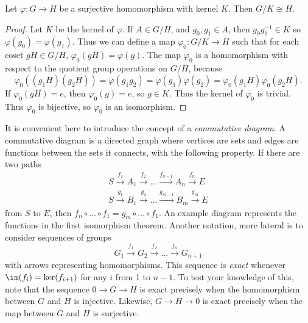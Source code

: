 \begin{theorem} 
Let $\varphi: G \to H$ be a surjective homomorphism with kernel $K$. Then $G/K \cong H$.
\end{theorem}
\begin{proof}
    Let $K$ be the kernel of $\varphi$. If $A \in G/H$, and $g_0,g_1 \in A$, then $g_0 g_1^{-1} \in K$ so $\varphi(g_0) = \varphi(g_1)$. Thus we can define a map $\varphi_0: G/K \to H$ such that for each coset $gH \in G/H$, $\varphi_0(gH) = \varphi(g)$. The map $\varphi_0$ is a homomorphism with respect to the quotient group operations on $G/H$, because
    \[ \varphi_0((g_1H)(g_2H)) = \varphi(g_1g_2) = \varphi(g_1) \varphi(g_2) = \varphi_0(g_1H) \varphi_0(g_2H). \]
    If $\varphi_0(gH) = e$, then $\varphi_0(g) = e$, so $g \in K$. Thus the kernel of $\varphi_0$ is trivial. Thus $\varphi_0$ is bijective, so $\varphi_0$ is an isomorphism.
\end{proof}

\begin{wrapfigure}{1}{3.5cm}
\end{wrapfigure}

It is convenient here to introduce the concept of a \emph{commutative diagram}. A commutative diagram is a directed graph where vertices are sets and edges are functions between the sets it connects, with the following property. If there are two paths
%
\begin{align*}
    S \xrightarrow{f_1} A_1 \xrightarrow{f_2} \dots \xrightarrow{f_{n-1}} A_n \xrightarrow{f_n} E\\
    S \xrightarrow{g_1} B_1 \xrightarrow{g_2} \dots \xrightarrow{g_{m-1}} B_m \xrightarrow{g_m} E
\end{align*}
%
from $S$ to $E$, then $f_n \circ \dots \circ f_1 = g_m \circ \dots \circ f_1$. An example diagram represents the functions in the first isomorphism theorem. Another notation, more lateral is to consider sequences of groups
%
\[ G_1 \xrightarrow{f_1} G_2 \xrightarrow{f_2} \dots \xrightarrow{f_{n}}G_{n+1} \]
%
with arrows representing homomorphisms. This sequence is \emph{exact} whenever $\im(f_i) = \ker(f_{i+1})$ for any $i$ from 1 to $n-1$. To test your knowledge of this, note that the sequence $0 \to G \to H$ is exact precisely when the homomorphism between $G$ and $H$ is injective. Likewise, $G \to H \to 0$ is exact precisely when the map between $G$ and $H$ is surjective.

